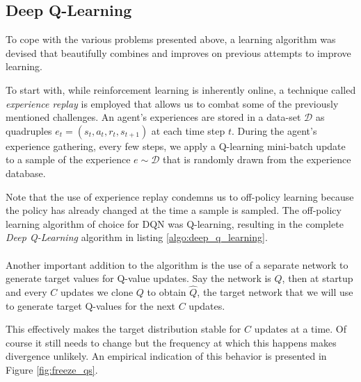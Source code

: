 \subsection{Deep Q-Learning}
\label{sub:deep_q_learning}
To cope with the various problems presented above,
a learning algorithm was devised that beautifully combines
and improves on previous attempts to improve learning.

To start with,
while reinforcement learning is inherently online,
a technique called \textit{experience replay}
\parencite{lin1993}
is employed that allows us to combat some of the previously mentioned challenges.
An agent's experiences are stored in a data-set $\mathcal{D}$
as quadruples $e_t = (s_t, a_t, r_t, s_{t+1})$
at each time step $t$.
During the agent's experience gathering,
every few steps,
we apply a Q-learning mini-batch update to a sample of the experience
$e \sim \mathcal{D}$
that is randomly drawn from the experience database.

Note that the use of experience replay condemns us to off-policy learning
because the policy has already changed at the time a sample is sampled.
The off-policy learning algorithm of choice for DQN
was Q-learning,
resulting in the complete \textit{Deep Q-Learning}
algorithm in listing \ref{algo:deep_q_learning}.

\paragraph{}
Another important addition to the algorithm
is the use of a separate network to generate target values
for Q-value updates.
Say the network is $Q$,
then at startup and every $C$ updates
we clone $Q$ to obtain $\hat{Q}$,
the target network that we will use to generate target Q-values
for the next $C$ updates.

This effectively makes the target distribution stable
for $C$ updates at a time.
Of course it still needs to change
but the frequency at which this happens
makes divergence unlikely.
An empirical indication of this behavior
is presented in Figure \ref{fig:freeze_qs}.

